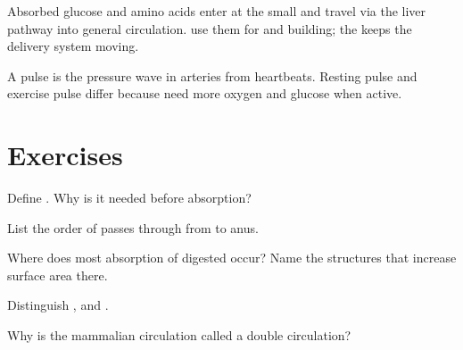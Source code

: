 \begin{proposition}\label{prop:g7:digestion:link}
Absorbed glucose and amino acids enter  at the small  and
travel via the liver pathway into general circulation.  use them for
 and building; the  keeps the delivery system moving.
\end{proposition}
\admitted

\begin{example}[Pulse]\label{ex:g7:digestion:pulse}
A pulse is the pressure wave in arteries from heartbeats. Resting pulse
and exercise pulse differ because  need more oxygen and glucose
when active.
\end{example}

\section{Exercises}

\begin{exercise}[$\star$]\label{exo:g7:digestion:1}
Define . Why is it needed before absorption?
\end{exercise}

\begin{exercise}[$\star$]\label{exo:g7:digestion:2}
List the order of   passes through from  to anus.
\end{exercise}

\begin{exercise}[$\star$]\label{exo:g7:digestion:3}
Where does most absorption of digested  occur? Name the structures
that increase surface area there.
\end{exercise}

\begin{exercise}[$\star$]\label{exo:g7:digestion:4}
Distinguish ,  and .
\end{exercise}

\begin{exercise}[$\star$]\label{exo:g7:digestion:5}
Why is the mammalian circulation called a double circulation?
\end{exercise}

